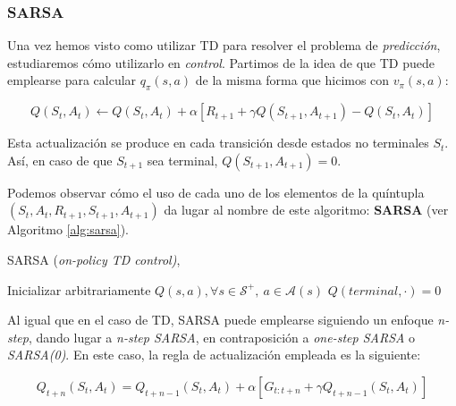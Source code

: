 \subsubsection{SARSA}

Una vez hemos visto como utilizar TD para resolver el problema de \textit{predicción}, estudiaremos cómo utilizarlo en \textit{control}. Partimos de la idea de que TD puede emplearse para calcular $q_\pi(s,a)$ de la misma forma que hicimos con $v_\pi(s,a)$:

\begin{equation}
    Q(S_t, A_t) \leftarrow Q(S_t, A_t) + \alpha \left [R_{t+1} + \gamma Q(S_{t+1}, A_{t+1}) - Q(S_t, A_t) \right ]
\end{equation}

Esta actualización se produce en cada transición desde estados no terminales $S_t$. Así, en caso de que $S_{t+1}$ sea terminal, $Q(S_{t+1}, A_{t+1}) = 0$. 

Podemos observar cómo el uso de cada uno de los elementos de la quíntupla $(S_t, A_t, R_{t+1}, S_{t+1}, A_{t+1})$ da lugar al nombre de este algoritmo: \textbf{SARSA} (ver Algoritmo \ref{alg:sarsa}).

\begin{algorithm}
\caption{SARSA (\textit{on-policy TD control)}, \cite{sutton2018reinforcement}}
\label{alg:sarsa}
\DontPrintSemicolon
\LinesNumbered
\KwIn{$\alpha$: el \textit{step-size} $\in (0,1]$ \newline
      $\epsilon > 0$}

Inicializar arbitrariamente $Q(s, a), \forall s \in \mathcal{S^+}, \ a \in \mathcal{A}(s)$\;
$Q(terminal, \cdot) = 0$\;

\end{algorithm}

Al igual que en el caso de TD, SARSA puede emplearse siguiendo un enfoque \textit{n-step}, dando lugar a \textit{n-step SARSA}, en contraposición a \textit{one-step SARSA} o \textit{SARSA(0)}. En este caso, la regla de actualización empleada es la siguiente:

\begin{equation}
    Q_{t+n}(S_t, A_t) = Q_{t+n-1}(S_t, A_t) + \alpha \left [G_{t:t+n} + \gamma Q_{t+n-1}(S_t, A_t) \right ]
\end{equation}


